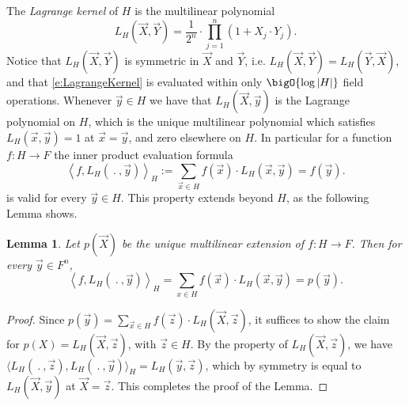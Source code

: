 \documentclass[11pt]{article}
\newtheorem{lem}[]{Lemma}
\theoremstyle{definition}
\theoremstyle{remark}
\begin{document}
The \textit{Lagrange kernel} of $H$ is the multilinear polynomial
\begin{equation}
\label{e:LagrangeKernel}
L_H(\vec X, \vec Y)  = \frac{1}{2^n}\cdot \prod_{j=1}^n (1 + X_j\cdot Y_j).
\end{equation}
Notice that $L_H(\vec X, \vec Y)$ is symmetric in $\vec X$ and $\vec Y$, i.e. $L_H(\vec X, \vec Y)=L_H(\vec Y, \vec X)$, and that \eqref{e:LagrangeKernel} is evaluated within only $\bigO{\log|H|}$ field operations.
Whenever $\vec y \in H$ we have that $L_H(\vec X, \vec y)$ is the Lagrange polynomial on $H$, which is the unique multilinear polynomial which satisfies $L_H(\vec x, \vec y) = 1$ at $\vec x = \vec y$, and zero elsewhere on $H$.
In particular for a function $f: H\rightarrow F$  the inner product evaluation formula 
\[
\left\langle f ,L_H(\:.\:, \vec y)\right\rangle_H := \sum_{\vec x\in H} f(\vec x) \cdot L_H(\vec x, \vec y) = f(\vec y).
\]
is valid for every $\vec y\in H$.
This property extends beyond $H$, as the following Lemma shows.
\begin{lem}
\label{lem:Lagrange}
Let $p(\vec X)$ be the unique multilinear extension of $f: H\rightarrow F$. 
Then for every $\vec y\in F^n$,
\begin{equation}
\label{e:LagrangeScalarProduct}
\left\langle f ,L_H(\:.\:, \vec y)\right\rangle_H = \sum_{x\in H} f(\vec x) \cdot L_H(\vec x, \vec y) = p(\vec y).
\end{equation}
\end{lem}
\begin{proof}
Since $p(\vec y) = \sum_{\vec x\in H} f(\vec z)\cdot L_H(\vec X,\vec z)$, it suffices to show the claim for $p(X) = L_H(\vec X,\vec z)$, with $\vec z\in H$.
By the property of $L_H(\vec X,\vec z)$, we have $\big\langle L_H(\:.\:, \vec z), L_H(\:.\:,\vec y) \big\rangle_H =L_H(\vec y,\vec z)$, which by symmetry is equal to $L_H(\vec X,\vec y)$ at $\vec X=\vec z$.
This completes the proof of the Lemma.
\end{proof}
\end{document}
